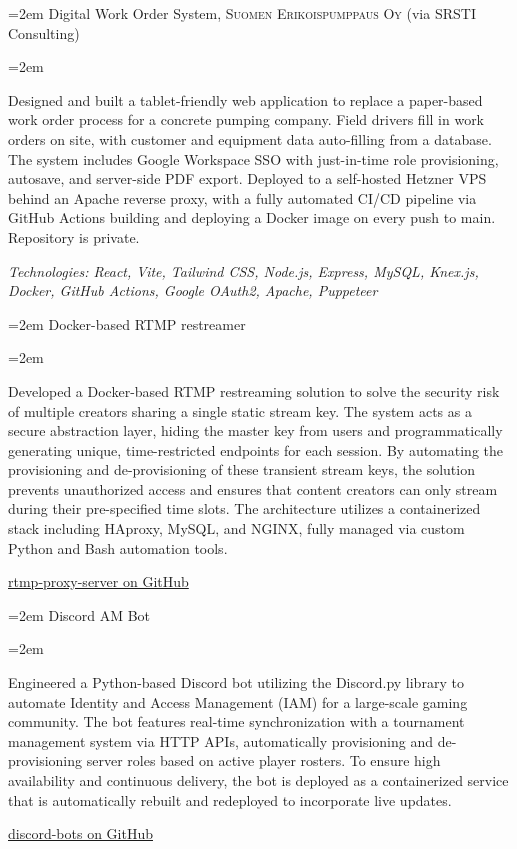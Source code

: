 \documentclass{scrartcl}
\newcommand{\MarginText}[1]{\marginpar{\raggedleft\itshape\small#1}}
\newcommand{\NewEntry}[3]{\noindent\hangindent=2em\hangafter=0 \MarginText{#1}#2 #3 \par\vspace{0.5em}}
\newcommand{\Description}[1]{\hangindent=2em\hangafter=0\noindent\raggedright\footnotesize{#1}\par\normalsize\vspace{1em}}
\begin{document}
\begin{cv}{\textbf{}}
\needspace{10em}
\NewEntry{2026--}{Digital Work Order System, \textsc{Suomen Erikoispumppaus Oy} (via SRSTI Consulting)}{}
\Description{\MarginText{}Designed and built a tablet-friendly web application to replace a paper-based work order process for a concrete pumping company. Field drivers fill in work orders on site, with customer and equipment data auto-filling from a database. The system includes Google Workspace SSO with just-in-time role provisioning, autosave, and server-side PDF export. Deployed to a self-hosted Hetzner VPS behind an Apache reverse proxy, with a fully automated CI/CD pipeline via GitHub Actions building and deploying a Docker image on every push to main. Repository is private.\par\vspace{0.5em}\textit{Technologies: React, Vite, Tailwind CSS, Node.js, Express, MySQL, Knex.js, Docker, GitHub Actions, Google OAuth2, Apache, Puppeteer}}

\needspace{10em}
\NewEntry{2021--}{Docker-based RTMP restreamer}{}
\Description{\MarginText{}Developed a Docker-based RTMP restreaming solution to solve the security risk of multiple creators sharing a single static stream key. The system acts as a secure abstraction layer, hiding the master key from users and programmatically generating unique, time-restricted endpoints for each session. By automating the provisioning and de-provisioning of these transient stream keys, the solution prevents unauthorized access and ensures that content creators can only stream during their pre-specified time slots. The architecture utilizes a containerized stack including HAproxy, MySQL, and NGINX, fully managed via custom Python and Bash automation tools.\par\vspace{0.5em}\faGithub \hspace{0.5em} \href{https://github.com/sntr8/rtmp-proxy-server}{rtmp-proxy-server on GitHub}}

\needspace{8em}
\NewEntry{2023--2026}{Discord AM Bot}{}
\Description{\MarginText{}Engineered a Python-based Discord bot utilizing the Discord.py library to automate Identity and Access Management (IAM) for a large-scale gaming community. The bot features real-time synchronization with a tournament management system via HTTP APIs, automatically provisioning and de-provisioning server roles based on active player rosters. To ensure high availability and continuous delivery, the bot is deployed as a containerized service that is automatically rebuilt and redeployed to incorporate live updates.\par\vspace{0.5em}\faGithub \hspace{0.5em} \href{https://github.com/sntr8/discord-bots}{discord-bots on GitHub}}


\end{cv}
\end{document}
